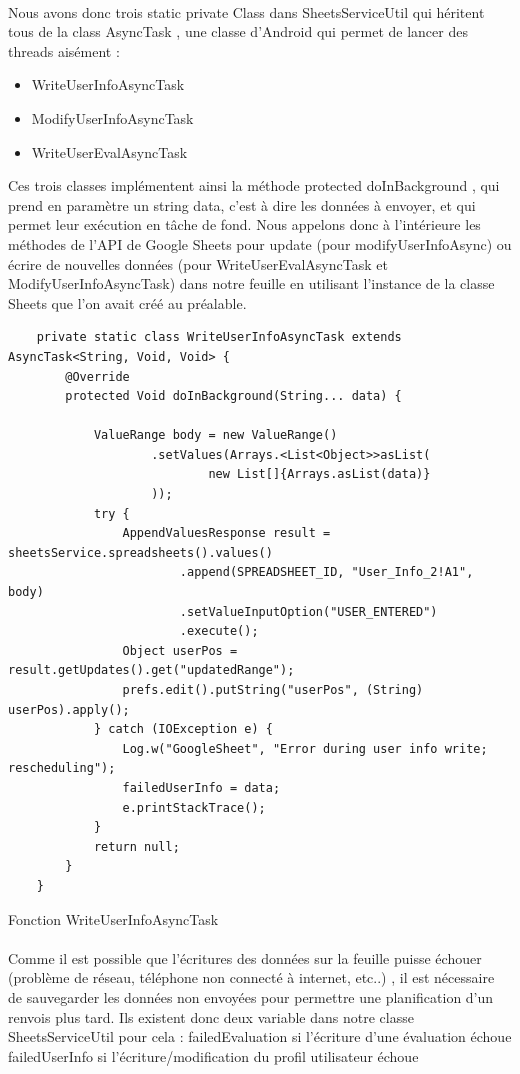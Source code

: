 \documentclass[a4paper, 10pt]{article}
\begin{document}
\paragraph{}
Nous avons donc trois static private Class dans SheetsServiceUtil qui héritent tous de la class AsyncTask , une classe d’Android qui permet de lancer des threads aisément : 
 \begin{itemize}
\item WriteUserInfoAsyncTask
\item ModifyUserInfoAsyncTask
\item WriteUserEvalAsyncTask
\end{itemize}
Ces trois classes implémentent ainsi la méthode protected doInBackground , qui prend en paramètre un string data, c’est à dire les données à envoyer, et qui permet leur exécution en tâche de fond.
Nous appelons donc à l'intérieure les méthodes de l’API de Google Sheets pour update (pour modifyUserInfoAsync) 
ou écrire de nouvelles données (pour WriteUserEvalAsyncTask et ModifyUserInfoAsyncTask) dans notre feuille en utilisant l’instance de la classe Sheets que l’on avait créé au préalable.
\hfill \break 
\begin{lstlisting}
    private static class WriteUserInfoAsyncTask extends AsyncTask<String, Void, Void> {
        @Override
        protected Void doInBackground(String... data) {

            ValueRange body = new ValueRange()
                    .setValues(Arrays.<List<Object>>asList(
                            new List[]{Arrays.asList(data)}
                    ));
            try {
            	AppendValuesResponse result = sheetsService.spreadsheets().values()
                        .append(SPREADSHEET_ID, "User_Info_2!A1", body)
                        .setValueInputOption("USER_ENTERED")
                        .execute();
            	Object userPos = result.getUpdates().get("updatedRange");
                prefs.edit().putString("userPos", (String) userPos).apply();
            } catch (IOException e) {
                Log.w("GoogleSheet", "Error during user info write; rescheduling");
                failedUserInfo = data;
                e.printStackTrace();
            }
            return null;
        }
    }
\end{lstlisting}
Fonction WriteUserInfoAsyncTask
\paragraph{}
Comme il est possible que l’écritures des données sur la feuille puisse échouer (problème de réseau, téléphone non connecté à internet, etc..) , il est nécessaire de sauvegarder les données non envoyées pour permettre une planification d’un renvois plus tard. Ils existent donc deux variable dans notre classe SheetsServiceUtil pour cela : 
failedEvaluation si l’écriture d’une évaluation échoue
failedUserInfo si l’écriture/modification du profil utilisateur échoue
\end{document}
